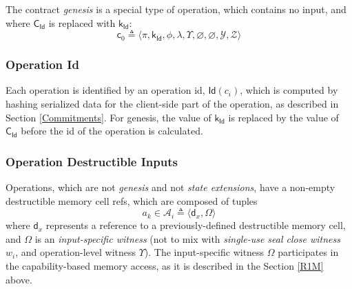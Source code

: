 \documentclass[9pt,oneside]{amsart}
\begin{document}
\begin{multicols}{2}
The contract \emph{genesis} is a special type of operation, which contains no input,
and where $\mathsf{C_{Id}}$ is replaced with $\mathsf{k_{Id}}$:
\noindent
\begin{equation}
\mathsf{c}_0 \triangleq \langle \pi, \mathsf{k_{Id}}, \phi, \lambda, \Upsilon, \varnothing, \varnothing, \mathcal{Y}, \mathcal{Z} \rangle
\end{equation}

\subsubsection{Operation Id}

Each operation is identified by an operation id, $\mathsf{Id}(c_i)$, which is computed by
hashing serialized data for the client-side part of the operation,
as described in Section \ref{Commitments}. For genesis, the value of $\mathsf{k_{Id}}$
is replaced by the value of $\mathsf{C_{Id}}$ before the id of the operation is calculated.

\subsubsection{Operation Destructible Inputs}\label{Input}

Operations, which are not \emph{genesis} and not \emph{state extensions},
have a non-empty destructible memory cell refs, which are composed of tuples
\noindent
\begin{equation}\label{eq:input}
a_k \in \mathcal{A}_i \triangleq \langle \mathsf{d}_x, \Omega \rangle
\end{equation}
\noindent
where $\mathsf{d}_x$ represents a reference to a previously-defined destructible memory cell,
and $\Omega$ is an \emph{input-specific witness}
(not to mix with \emph{single-use seal close witness} $w_i$,
and operation-level witness $\Upsilon$).
The input-specific witness $\Omega$ participates in the capability-based memory access,
as it is described in the Section \ref{R1M} above.

\end{multicols}
\end{document}
